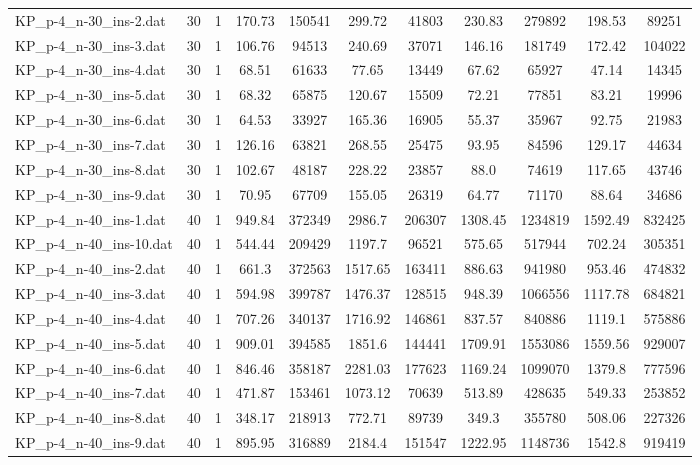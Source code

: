 \begin{table}[!ht]
\begin{tabular}{lcccccccccc}
KP\_p-4\_n-30\_ins-2.dat & 30 & 1 & 170.73 & 150541 & 299.72 & 41803 & 230.83 & 279892 & 198.53 & 89251 \\
KP\_p-4\_n-30\_ins-3.dat & 30 & 1 & 106.76 & 94513 & 240.69 & 37071 & 146.16 & 181749 & 172.42 & 104022 \\
KP\_p-4\_n-30\_ins-4.dat & 30 & 1 & 68.51 & 61633 & 77.65 & 13449 & 67.62 & 65927 & 47.14 & 14345 \\
KP\_p-4\_n-30\_ins-5.dat & 30 & 1 & 68.32 & 65875 & 120.67 & 15509 & 72.21 & 77851 & 83.21 & 19996 \\
KP\_p-4\_n-30\_ins-6.dat & 30 & 1 & 64.53 & 33927 & 165.36 & 16905 & 55.37 & 35967 & 92.75 & 21983 \\
KP\_p-4\_n-30\_ins-7.dat & 30 & 1 & 126.16 & 63821 & 268.55 & 25475 & 93.95 & 84596 & 129.17 & 44634 \\
KP\_p-4\_n-30\_ins-8.dat & 30 & 1 & 102.67 & 48187 & 228.22 & 23857 & 88.0 & 74619 & 117.65 & 43746 \\
KP\_p-4\_n-30\_ins-9.dat & 30 & 1 & 70.95 & 67709 & 155.05 & 26319 & 64.77 & 71170 & 88.64 & 34686 \\
KP\_p-4\_n-40\_ins-1.dat & 40 & 1 & 949.84 & 372349 & 2986.7 & 206307 & 1308.45 & 1234819 & 1592.49 & 832425 \\
KP\_p-4\_n-40\_ins-10.dat & 40 & 1 & 544.44 & 209429 & 1197.7 & 96521 & 575.65 & 517944 & 702.24 & 305351 \\
KP\_p-4\_n-40\_ins-2.dat & 40 & 1 & 661.3 & 372563 & 1517.65 & 163411 & 886.63 & 941980 & 953.46 & 474832 \\
KP\_p-4\_n-40\_ins-3.dat & 40 & 1 & 594.98 & 399787 & 1476.37 & 128515 & 948.39 & 1066556 & 1117.78 & 684821 \\
KP\_p-4\_n-40\_ins-4.dat & 40 & 1 & 707.26 & 340137 & 1716.92 & 146861 & 837.57 & 840886 & 1119.1 & 575886 \\
KP\_p-4\_n-40\_ins-5.dat & 40 & 1 & 909.01 & 394585 & 1851.6 & 144441 & 1709.91 & 1553086 & 1559.56 & 929007 \\
KP\_p-4\_n-40\_ins-6.dat & 40 & 1 & 846.46 & 358187 & 2281.03 & 177623 & 1169.24 & 1099070 & 1379.8 & 777596 \\
KP\_p-4\_n-40\_ins-7.dat & 40 & 1 & 471.87 & 153461 & 1073.12 & 70639 & 513.89 & 428635 & 549.33 & 253852 \\
KP\_p-4\_n-40\_ins-8.dat & 40 & 1 & 348.17 & 218913 & 772.71 & 89739 & 349.3 & 355780 & 508.06 & 227326 \\
KP\_p-4\_n-40\_ins-9.dat & 40 & 1 & 895.95 & 316889 & 2184.4 & 151547 & 1222.95 & 1148736 & 1542.8 & 919419 \\

\end{tabular}
\end{table}
